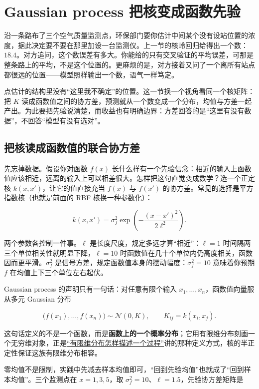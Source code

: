 \section{Gaussian process 把核变成函数先验}
\label{sec:13-Machine-Learning/09-Kernel-Methods-and-Gaussian-Processes/05}

沿一条路布了三个空气质量监测点，环保部门要你估计中间某个没有设站位置的浓度，据此决定要不要在那里加设一台监测仪。上一节的核岭回归给得出一个数：\(18.4\)。对方追问，这个数误差有多大。你能给的只有交叉验证的平均误差，可那是整条路上的平均，不是这个位置的。更麻烦的是，对方接着又问了一个离所有站点都很远的位置——模型照样输出一个数，语气一样笃定。

点估计的结构里没有``这里我不确定''的位置。这一节换一个视角看同一个核矩阵：把 \(K\) 读成函数值之间的协方差，预测就从一个数变成一个分布，均值与方差一起产出。为此要把先验说清楚，而收益也有明确边界：方差回答的是``这里有没有数据''，不回答``模型有没有选对''。

\subsection{把核读成函数值的联合协方差}

先忘掉数据。假设你对函数 \(f(x)\) 长什么样有一个先验信念：相近的输入上函数值应该相近，远离的输入上可以相差很大。怎样把这句直觉变成数学？选一个正定核 \(k(x,x')\)，让它的值直接充当 \(f(x)\) 与 \(f(x')\) 的协方差。常见的选择是平方指数核（也就是前面的 RBF 核换一种参数化）：

\[
k(x,x')=\sigma_f^2\exp\left(-\frac{(x-x')^2}{2\ell^2}\right).
\]

两个参数各控制一件事。\(\ell\) 是长度尺度，规定多远才算``相近''：\(\ell=1\) 时间隔两三个单位相关性就明显下降，\(\ell=10\) 时函数值在几十个单位内仍高度相关，函数因而更平滑。\(\sigma_f^2\) 是信号方差，规定函数值本身的摆动幅度：\(\sigma_f^2=10\) 意味着你预期 \(f\) 在均值上下三个单位左右起伏。

Gaussian process 的声明只有一句话：对任意有限个输入 \(x_1,\dots,x_n\)，函数值向量服从多元 Gaussian 分布

\[
\bigl(f(x_1),\dots,f(x_n)\bigr)\sim\mathcal{N}(0,K),
\qquad K_{ij}=k(x_i,x_j).
\]

这句话定义的不是一个函数，而是\textbf{函数上的一个概率分布}；它用有限维分布刻画一个无穷维对象，正是\hyperref[sec:06-Random-Processes/01-Foundations/02]{``有限维分布怎样描述一个过程''}讲的那种定义方式，核的半正定性保证这族有限维分布相容。

零均值不是限制，实践中先减去样本均值即可，``回到先验均值''也就成了``回到样本均值''。三个监测点在 \(x=1,3,5\)，取 \(\sigma_f^2=10\)、\(\ell=1.5\)，先验协方差矩阵是

